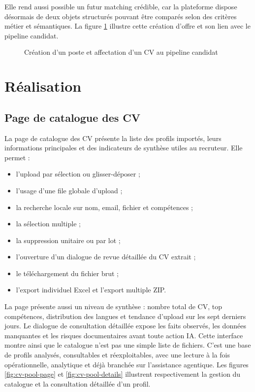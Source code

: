 Elle rend aussi possible un futur matching crédible, car la plateforme dispose désormais de deux objets structurés pouvant être comparés selon des critères métier et sémantiques.
La figure \ref{fig:job-assignment-sequence} illustre cette création d'offre et son lien avec le pipeline candidat.

\begin{figure}[H]
  \centering
  \caption{\label{fig:job-assignment-sequence}Création d'un poste et affectation d'un CV au pipeline candidat}
\end{figure}

\section{Réalisation}

\subsection{Page de catalogue des CV}
La page de catalogue des CV présente la liste des profils importés, leurs informations principales et des indicateurs de synthèse utiles au recruteur. Elle permet :
\begin{itemize}
  \item l'upload par sélection ou glisser-déposer ;
  \item l'usage d'une file globale d'upload ;
  \item la recherche locale sur nom, email, fichier et compétences ;
  \item la sélection multiple ;
  \item la suppression unitaire ou par lot ;
  \item l'ouverture d'un dialogue de revue détaillée du CV extrait ;
  \item le téléchargement du fichier brut ;
  \item l'export individuel Excel et l'export multiple ZIP.
\end{itemize}

La page présente aussi un niveau de synthèse : nombre total de CV, top compétences, distribution des langues et tendance d'upload sur les sept derniers jours. Le dialogue de consultation détaillée expose les faits observés, les données manquantes et les risques documentaires avant toute action IA.
Cette interface montre ainsi que le catalogue n'est pas une simple liste de fichiers. C'est une base de profils analysés, consultables et réexploitables, avec une lecture à la fois opérationnelle, analytique et déjà branchée sur l'assistance agentique. Les figures \ref{fig:cv-pool-page} et \ref{fig:cv-pool-details} illustrent respectivement la gestion du catalogue et la consultation détaillée d'un profil.

